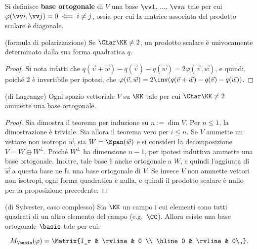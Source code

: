 \documentclass[11pt]{article}
\begin{document}
	\begin{definition}
		Si definisce \textbf{base ortogonale} di $V$ una base $\vv 1$, ..., $\vv n$ tale per cui $\varphi(\vv i, \vv j) = 0
		\impliedby i \neq j$, ossia per cui la matrice associata del prodotto scalare è diagonale. 
	\end{definition}

	\begin{proposition} (formula di polarizzazione)
		Se $\Char \KK \neq 2$, un prodotto scalare è univocamente determinato dalla sua forma quadratica $q$.
	\end{proposition}

	\begin{proof}
		Si nota infatti che $q(\vec v + \vec w) - q(\vec v) - q(\vec w) = 2 \varphi(\vec v, \vec w)$, e quindi,
		poiché $2$ è invertibile per ipotesi, che $\varphi(\vec v, \vec w) = 2\inv (q(\vec v + \vec w) - q(\vec v) - q(\vec w))$.
	\end{proof}

	\begin{theorem}(di Lagrange)
		Ogni spazio vettoriale $V$ su $\KK$ tale per cui $\Char \KK \neq 2$ ammette una base ortogonale.
	\end{theorem}

	\begin{proof}
		Sia dimostra il teorema per induzione su $n := \dim V$. Per $n \leq 1$, la dimostrazione è triviale. Sia
		allora il teorema vero per $i \leq n$. Se $V$ ammette un vettore non isotropo $\vec w$, sia $W = \Span(\vec w)$ e si consideri la decomposizione $V = W \oplus W^\perp$. Poiché $W^\perp$ ha dimensione $n-1$, per ipotesi induttiva
		ammette una base ortogonale. Inoltre, tale base è anche ortogonale a $W$, e quindi l'aggiunta di $\vec w$ a
		questa base ne fa una base ortogonale di $V$. Se invece $V$ non ammette vettori non isotropi, ogni forma quadratica
		è nulla, e quindi il prodotto scalare è nullo per la proposizione precedente.
	\end{proof}

	\begin{theorem} (di Sylvester, caso complesso)
		Sia $\KK$ un campo i cui elementi sono tutti quadrati di un
		altro elemento del campo (e.g.~$\CC$). Allora esiste una base
		ortogonale $\basis$ tale per cui:
		
		\[ M_\basis(\varphi) = \Matrix{I_r & \rvline & 0 \\ \hline 0 & \rvline & 0\,}. \]
	\end{theorem}
\end{document}
